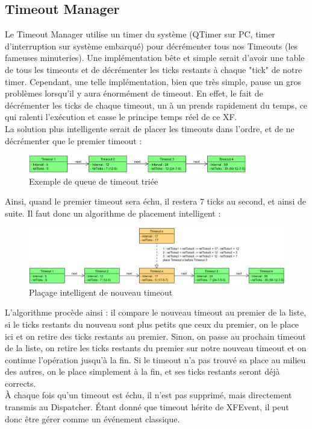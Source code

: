 \subsection{Timeout Manager}
Le Timeout Manager utilise un timer du système (QTimer sur PC,
timer d'interruption sur système embarqué) pour décrémenter tous nos
Timeouts (les fameuses minuteries).
Une implémentation bête et simple serait d'avoir une table de tous les timeouts
et de décrémenter les ticks restants à chaque "tick" de notre timer.
Cependant, une telle implémentation, bien que très simple, pause un gros problèmes lorsqu'il
y aura énormément de timeout. En effet, le fait de décrémenter les ticks de chaque timeout, un à
un prends rapidement du temps, ce qui ralenti l'exécution et casse le principe temps réel de ce
XF.\\
La solution plus intelligente serait de placer les timeouts dans l'ordre, et de ne décrémenter
que le premier timeout :
\begin{figure}[H]
    \centering
    \includegraphics[width=0.85\textwidth]{Images/xf/timeoutList.PNG}
    \caption[A sorted timeout queue]{Exemple de queue de timeout triée}
\end{figure}
Ainsi, quand le premier timeout sera échu, il restera 7 ticks au second, et ainsi de suite.
Il faut donc un algorithme de placement intelligent :
\begin{figure}[H]
    \centering
    \includegraphics[width=\textwidth]{Images/xf/timeoutSmartList.png}
    \caption{Plaçage intelligent de nouveau timeout}
\end{figure}
L'algorithme procède ainsi : il compare le nouveau timeout au premier de la liste,
si le ticks restants du nouveau sont plus petits que ceux du premier, on le place 
ici et on retire des ticks restants au premier. Sinon, on passe au prochain timeout
de la liste, on retire les ticks restants du premier sur notre nouveau timeout et on continue l'opération jusqu'à la fin.
Si le timeout n'a pas trouvé sa place au milieu des autres, on le place simplement à
la fin, et ses ticks restants seront déjà corrects.\\
À chaque fois qu'un timeout est échu, il n'est pas supprimé, mais directement 
transmis au Dispatcher. Étant donné que timeout hérite de XFEvent, il peut donc
être gérer comme un événement classique.

